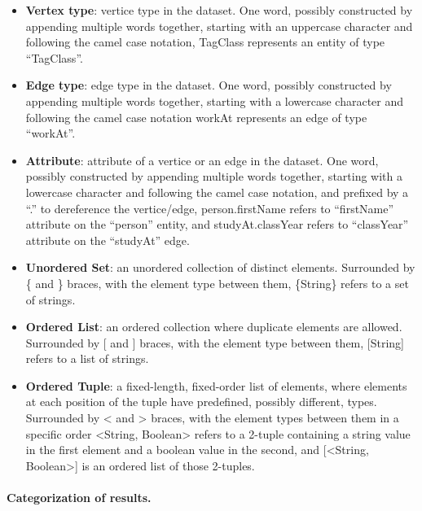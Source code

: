 \begin{itemize}
	\item \textbf{Vertex type}: vertice type in the dataset.
		One word, possibly constructed by appending multiple words together, starting with an uppercase character and following the camel case notation,
        \eg \textsf{TagClass} represents an entity of type ``TagClass''.
    \item \textbf{Edge type}: edge type in the dataset.
        One word, possibly constructed by appending multiple words together, starting with a lowercase character and following the camel case notation
        \eg \mbox{\textsf{workAt}} represents an edge of type ``workAt''.
    \item \textbf{Attribute}: attribute of a vertice or an edge in the dataset.
        One word, possibly constructed by appending multiple words together, starting with a lowercase character and following the camel case notation,
        and prefixed by a ``.'' to dereference the vertice/edge,
        \eg \textsf{person.firstName} refers to ``firstName'' attribute on the ``person'' entity,
        and \mbox{\textsf{studyAt.classYear}} refers to ``classYear'' attribute on the ``studyAt'' edge.
    \item \textbf{Unordered Set}: an unordered collection of distinct elements.
        Surrounded by \{ and \} braces, with the element type between them,
        \eg \textsf{\{String\}} refers to a set of strings.
    \item \textbf{Ordered List}: an ordered collection where duplicate elements are allowed.
        Surrounded by [ and ] braces, with the element type between them,
        \eg \textsf{[String]} refers to a list of strings.
    \item \textbf{Ordered Tuple}: a fixed-length, fixed-order list of elements, where elements at each position of the tuple have predefined, possibly different, types.
        Surrounded by < and > braces, with the element types between them in a specific order
        \eg \textsf{<String, Boolean>} refers to a 2-tuple containing a string value in the first element and a boolean value in the second,
        and \textsf{[<String, Boolean>]} is an ordered list of those 2-tuples.
\end{itemize}

\paragraph{Categorization of results.}

